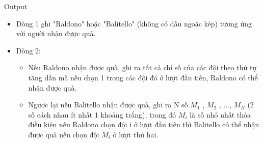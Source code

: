 Output
\begin{itemize}
	\item Dòng 1 ghi "Raldono" hoặc "Balitello" (không có dấu ngoặc kép) tương ứng với người nhận được quà.
	\item Dòng 2:
\begin{itemize}
	\item Nếu Raldono nhận được quà, ghi ra tất cả chỉ số của các đội theo thứ tự tăng dần mà nếu chọn 1 trong các đội đó ở lượt đầu tiên, Raldono có thể nhận được quà.
	\item Ngược lại nếu Balitello nhận được quà, ghi ra N số $M_{1}$ , $M_{2}$ , ..., $M_{N}$ (2 số cách nhau ít nhất 1 khoảng trắng), trong đó $M_{i}$ là số nhỏ nhất thỏa điều kiện nếu Raldono chọn đội i ở lượt đầu tiên thì Balitello có thể nhận được quà nếu chọn đội $M_{i}$ ở lượt thứ hai.
\end{itemize}
\end{itemize}